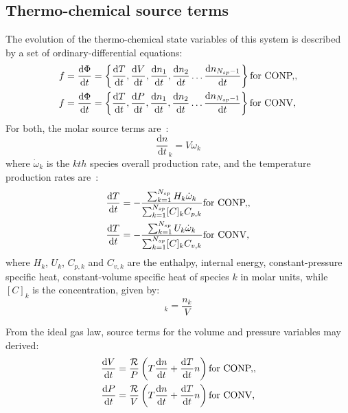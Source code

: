\documentclass[12pt]{article}
\newcommand{\ns}{N_{sp}}
\newcommand{\conp}{CONP}
\newcommand{\conv}{CONV}
\newcommand{\dconp}{\ifmmode\text{for \conp,}\else for \conp,\fi}
\newcommand{\dconv}{\ifmmode\text{for \conv,}\else for \conv,\fi}
\newcommand{\Ru}{\mathcal{R}}
\begin{document}
\subsection{Thermo-chemical source terms}
The evolution of the thermo-chemical state variables of this system is described by a set of ordinary-differential equations:
\begin{subequations}
\label{e:source_terms}
\begin{align}
f &= \frac{\text{d} \Phi }{\text{d} t } = \left\{\frac{\text{d} T }{\text{d} t },\frac{\text{d} V }{\text{d} t },\frac{\text{d} n_1}{\text{d} t },\frac{\text{d} n_2 }{\text{d} t }\ldots \frac{\text{d} n_{\ns - 1} }{\text{d} t }\right\}\dconp, \\
f &= \frac{\text{d} \Phi }{\text{d} t } = \left\{\frac{\text{d} T }{\text{d} t },\frac{\text{d} P }{\text{d} t },\frac{\text{d} n_1}{\text{d} t },\frac{\text{d} n_2 }{\text{d} t }\ldots \frac{\text{d} n_{\ns - 1} }{\text{d} t }\right\}\dconv 
\end{align}
\end{subequations}
For both, the molar source terms are~\cite{TurnsStephenR2012Aitc}:
\begin{equation}
\frac{\text{d} n }{\text{d} t }_{k} = V \dot{\omega}_{k} \label{e:spec}
\end{equation}
where $\dot{\omega}_k$ is the $kth$ species overall production rate, and the temperature production rates are~\cite{TurnsStephenR2012Aitc}:
\begin{subequations}
\label{e:temperature_incomplete}
\begin{align}
\frac{\text{d} T }{\text{d} t } &= - \frac{\sum_{k=1}^{\ns} H_{k} \dot{\omega}_{k}}{\sum_{k=1}^{\ns} [C]_{k} {C_{p, k}}}\dconp, \\
\frac{\text{d} T }{\text{d} t } &= - \frac{\sum_{k=1}^{\ns} U_{k} \dot{\omega}_{k}}{\sum_{k=1}^{\ns} [C]_{k} {C_{v, k}}}\dconv
\end{align}
\end{subequations}
where $H_k$, $U_k$, $C_{p,k}$ and $C_{v, k}$ are the enthalpy, internal energy, constant-pressure specific heat, constant-volume specific heat of species $k$ in molar units, while $[C]_{k}$ is the concentration, given by:
\begin{equation}
 [C]_{k} = \frac{n_{k}}{V}
\end{equation}


From the ideal gas law, source terms for the volume and pressure variables may derived:
\begin{subequations}
\label{e:param_incomplete}
\begin{align}
\frac{\text{d} V }{\text{d} t } &= \frac{\Ru}{P} \left(T \frac{\text{d} n }{\text{d} t } + \frac{\text{d} T }{\text{d} t } n\right)\dconp, \\
\frac{\text{d} P }{\text{d} t } &= \frac{\Ru}{V} \left(T \frac{\text{d} n }{\text{d} t } + \frac{\text{d} T }{\text{d} t } n\right)\dconv
\end{align}
\end{subequations}
\end{document}
